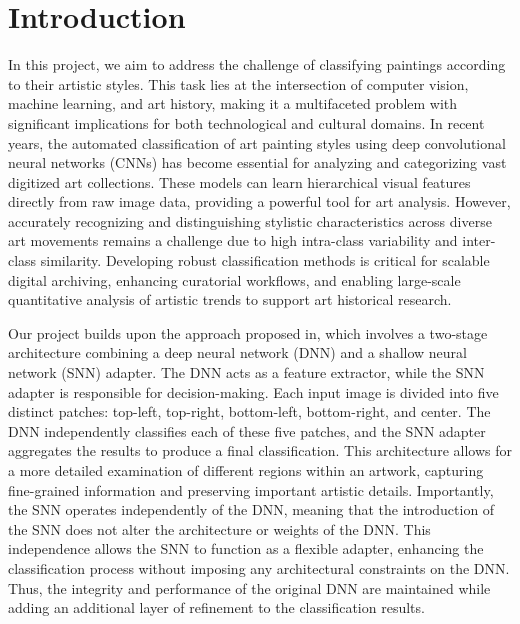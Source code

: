 \section{Introduction}

In this project, we aim to address the challenge of classifying paintings according to their artistic styles. This task lies at the intersection of computer vision, machine learning, and art history, making it a multifaceted problem with significant implications for both technological and cultural domains\cite{CETINIC2018107}. In recent years, the automated classification of art painting styles using deep convolutional neural networks (CNNs) has become essential for analyzing and categorizing vast digitized art collections. These models can learn hierarchical visual features directly from raw image data, providing a powerful tool for art analysis\cite{li2025enhanced}\cite{imran2023artistic}. However, accurately recognizing and distinguishing stylistic characteristics across diverse art movements remains a challenge due to high intra-class variability and inter-class similarity\cite{alkofer2021using}. Developing robust classification methods is critical for scalable digital archiving, enhancing curatorial workflows, and enabling large-scale quantitative analysis of artistic trends to support art historical research.

Our project builds upon the approach proposed in\cite{imran2023artistic}, which involves a two-stage architecture combining a deep neural network (DNN) and a shallow neural network (SNN) adapter. The DNN acts as a feature extractor, while the SNN adapter is responsible for decision-making. Each input image is divided into five distinct patches: top-left, top-right, bottom-left, bottom-right, and center. The DNN independently classifies each of these five patches, and the SNN adapter aggregates the results to produce a final classification. This architecture allows for a more detailed examination of different regions within an artwork, capturing fine-grained information and preserving important artistic details\cite{imran2023artistic}. Importantly, the SNN operates independently of the DNN, meaning that the introduction of the SNN does not alter the architecture or weights of the DNN. This independence allows the SNN to function as a flexible adapter, enhancing the classification process without imposing any architectural constraints on the DNN. Thus, the integrity and performance of the original DNN are maintained while adding an additional layer of refinement to the classification results.

